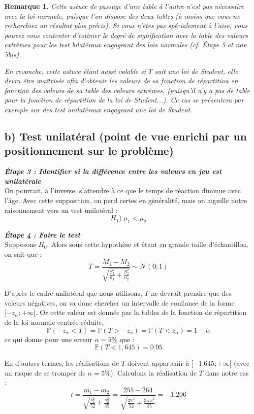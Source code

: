 \documentclass[a4paper,oneside,12pt]{article}
\theoremstyle{plain}
\newtheorem*{remark}{Remarque}
\def\P{{\mathbb P}}
\begin{document}
\begin{remark}
Cette astuce de passage d'une table à l'autre n'est pas nécessaire avec la loi normale, puisque l'on dispose des deux tables (à moins que vous ne recherchiez un résultat plus précis). Si vous n'êtes pas spécialement à l'aise, vous pouvez vous contenter d'estimer le degré de signification avec la table des valeurs extrêmes pour les test bilatéraux engageant des lois normales (cf. Étape 5 et non 5bis).

En revanche, cette astuce étant aussi valable si $T$ suit une loi de Student, elle devra être maîtrisée afin d'obtenir les valeurs de sa fonction de répartition en fonction des valeurs de sa table des valeurs extrêmes, (puisqu'il n'y a pas de table pour la fonction de répartition de la loi de Student...). Ce cas se présentera par exemple sur des test unilatéraux engageant une loi de Student.
\end{remark}

\subsection*{b) Test unilatéral (point de vue enrichi par un positionnement sur le problème)}

\textit{\textbf{Étape 3 : Identifier si la différence entre les valeurs en jeu est unilatérale}}\\
On pourrait, à l'inverse, s'attendre à ce que le temps de réaction diminue avec l'âge. Avec cette supposition, on perd certes en généralité, mais on aiguille notre raisonnement vers un test unilatéral :
$$H_1) \;\mu_1<\mu_2$$ 
    
\textit{\textbf{Étape 4 : Faire le test}}\\
Supposons $H_0$. Alors sous cette hypothèse et étant en grande taille d'échantillon, on sait que :
$$ T = \frac{M_1 -M_2}{\sqrt{\frac{S_1^2}{n_1}+\frac{S_2^2}{n_2}}} \sim \mathcal{N}(0;1)$$
    
D'après le cadre unilatéral que nous utilisons, $T$ ne devrait prendre que des valeurs négatives, on va donc chercher un intervalle de confiance de la forme $[-z_\alpha;+\infty[$. Or cette valeur est donnée par la tables de la fonction de répartition de la loi normale centrée réduite, 
$$\P(-z_\alpha<T) = \P(T>-z_\alpha) = \P(T<z_\alpha) = 1-\alpha$$
ce qui donne pour une erreur $\alpha = 5\%$ que :
$$\P(T < 1,645) = 0.95$$
    
En d'autres termes, les réalisations de $T$ doivent appartenir à $[-1.645;+\infty[$ (avec un risque de se tromper de $\alpha = 5\%$). Calculons la réalisation de $T$ dans notre cas :
$$ t = \frac{m_1 -m_2}{\sqrt{\frac{s_1^2}{52}+\frac{s_2^2}{35}}} =  \frac{255 -264}{\sqrt{\frac{32^2}{52}+\frac{35.5^2}{35}}} = -1.206$$
    
\end{document}
